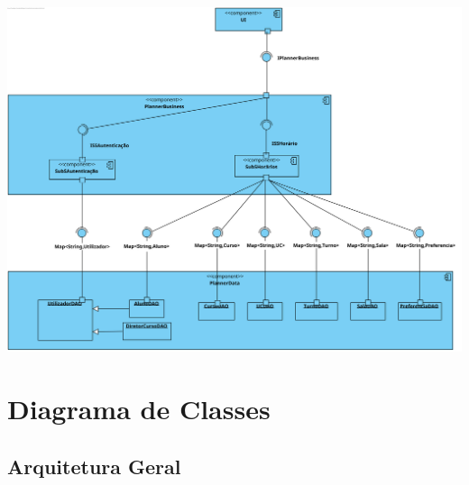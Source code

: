 \documentclass[a4paper,12pt]{scrreprt}
\begin{document}
\vspace{0.5cm}

\begin{minipage}{\textwidth}
    \centering
    \includegraphics[width=.95\textwidth]{images/components-diagrams/2.png}
    \label{fig:4-2-diagrama_de_componentes_daos}
\end{minipage}



\chapter{Diagrama de Classes}

\section{Arquitetura Geral}
\end{document}
